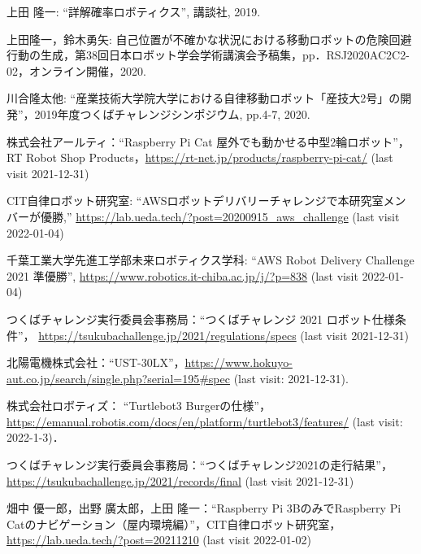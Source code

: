 \documentclass[twocolumn,9pt]{jsproceedings}
\begin{document}
\begin{thebibliography}{99}
上田 隆一: ``詳解確率ロボティクス'', 講談社, 2019.

 上田隆一，鈴木勇矢: 自己位置が不確かな状況における移動ロボットの危険回避行動の生成，第38回日本ロボット学会学術講演会予稿集，pp．RSJ2020AC2C2-02，オンライン開催，2020.

  川合隆太他: ``産業技術大学院大学における自律移動ロボット「産技大2号」の開発''，2019年度つくばチャレンジシンポジウム, pp.4-7, 2020.

  株式会社アールティ：``Raspberry Pi Cat 屋外でも動かせる中型2輪ロボット''，
  RT Robot Shop Products，\url{https://rt-net.jp/products/raspberry-pi-cat/} (last visit 2021-12-31)

	  CIT自律ロボット研究室: ``AWSロボットデリバリーチャレンジで本研究室メンバーが優勝,'' \url{https://lab.ueda.tech/?post=20200915_aws_challenge} (last visit 2022-01-04)

	  千葉工業大学先進工学部未来ロボティクス学科: ``AWS Robot Delivery Challenge 2021 準優勝'', \url{https://www.robotics.it-chiba.ac.jp/j/?p=838} (last visit 2022-01-04)
  
  つくばチャレンジ実行委員会事務局：``つくばチャレンジ 2021 ロボット仕様条件''，
  \url{https://tsukubachallenge.jp/2021/regulations/specs} (last visit 2021-12-31)
  
  北陽電機株式会社：``UST-30LX''，\url{https://www.hokuyo-aut.co.jp/search/single.php?serial=195#spec} (last visit: 2021-12-31).
  
  株式会社ロボティズ： ``Turtlebot3 Burgerの仕様''，\url{https://emanual.robotis.com/docs/en/platform/turtlebot3/features/} (last visit: 2022-1-3)．
  
  つくばチャレンジ実行委員会事務局：``つくばチャレンジ2021の走行結果''，
  \url{https://tsukubachallenge.jp/2021/records/final} (last visit 2021-12-31)

	  畑中 優一郎，出野 廣太郎，上田 隆一：``Raspberry Pi 3BのみでRaspberry Pi Catのナビゲーション（屋内環境編）''，CIT自律ロボット研究室，\url{https://lab.ueda.tech/?post=20211210} (last visit 2022-01-02)
\end{thebibliography}
\normalsize

\clearpage
\end{document}
